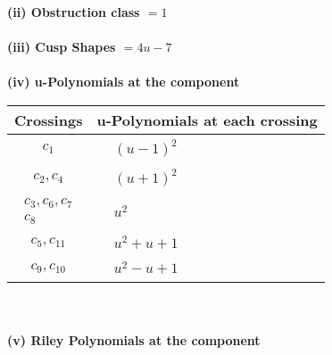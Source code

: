 \documentclass[1p]{elsarticle_modified}
\theoremstyle{definition}
\begin{document}
\flushleft \textbf{(ii) Obstruction class $= 1$}\\~\\
\flushleft \textbf{(iii) Cusp Shapes $= 4 u-7$}\\~\\
\newpage\renewcommand{\arraystretch}{1}
\flushleft \textbf{(iv) u-Polynomials at the component}\newline \\
\begin{tabular}{m{50pt}|m{274pt}}
Crossings & \hspace{64pt}u-Polynomials at each crossing \\
\hline $$\begin{aligned}c_{1}\end{aligned}$$&$\begin{aligned}
&(u-1)^2
\end{aligned}$\\
\hline $$\begin{aligned}c_{2},c_{4}\end{aligned}$$&$\begin{aligned}
&(u+1)^2
\end{aligned}$\\
\hline $$\begin{aligned}c_{3},c_{6},c_{7}\\c_{8}\end{aligned}$$&$\begin{aligned}
&u^2
\end{aligned}$\\
\hline $$\begin{aligned}c_{5},c_{11}\end{aligned}$$&$\begin{aligned}
&u^2+u+1
\end{aligned}$\\
\hline $$\begin{aligned}c_{9},c_{10}\end{aligned}$$&$\begin{aligned}
&u^2- u+1
\end{aligned}$\\
\hline
\end{tabular}\\~\\
\newpage\renewcommand{\arraystretch}{1}
\flushleft \textbf{(v) Riley Polynomials at the component}\newline \\
\end{document}
